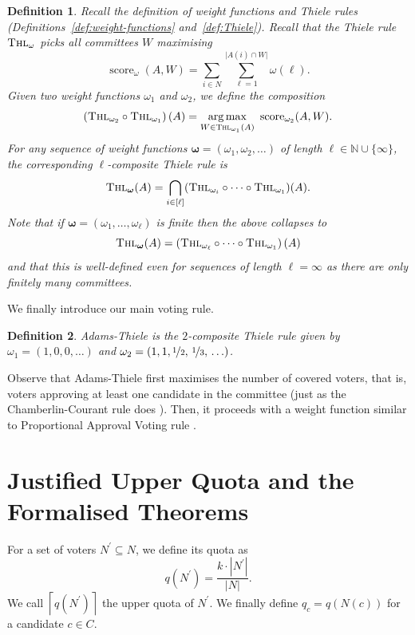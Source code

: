 \documentclass[11pt,a4paper]{article}
\newcommand{\voters}{N}
\newcommand{\candidates}{C}
\newcommand{\approfile}{A}
\newcommand{\app}[1]{A(#1)}
\newcommand{\committee}{W}
\newcommand{\weight}{\omega}
\newcommand{\num}{\ell}
\newcommand{\nats}{\mathbb N}
\newcommand{\Thiele}{\textnormal{\textsc{Thl}}}
\newcommand{\score}{\operatorname{score}}
\newcommand{\quota}{q}
\newcommand{\Adams}{\textnormal{Adams-Thiele}}
\newcommand{\vect}[1]{\left(#1\right)}
\newcommand{\ceil}[1]{\left\lceil#1\right\rceil}
\DeclareMathOperator*{\argmax}{arg\,max}
\newtheorem{definition}{Definition}
\begin{document}
\begin{definition}
  Recall the definition of weight functions
  and Thiele rules (Definitions~\ref{def:weight-functions} and~\ref{def:Thiele}).
  Recall that the Thiele rule $\Thiele_\weight$ picks
  all committees $\committee$ maximising
  \[
\score_{\weight}(\approfile,
    \committee)=
    \sum_{i\in\voters}\sum_{\num=1}^{\lvert\app{i}\cap
    \committee\rvert}\weight(\num).
  \]
  Given two weight functions $\weight_1$ and $\weight_2$, we define the composition
  \[
    \left(\Thiele_{\weight_2}\circ \Thiele_{\weight_1}\right)(\approfile) = \argmax_{\committee\in
    \Thiele_{\weight_1}\vect{\approfile}}\ \score_{\weight_2}\mathclose{\vect{\approfile, \committee}}.
  \]
  For any sequence of weight functions $\boldsymbol{\weight}=\vect{\weight_1,\weight_2,\ldots}$
  of length $\num\in\nats\cup\{\infty\}$,
  the
  corresponding \emph{$\num$-composite Thiele rule} is
  \[
    \Thiele_{\boldsymbol{\weight}}(\approfile) = \bigcap_{i\in[\num]}
    (\Thiele_{\weight_i}\circ \cdots \circ \Thiele_{\weight_1})(\approfile).
  \]
  Note that if $\boldsymbol{\weight}=\vect{\weight_1,\ldots,
  \weight_\num}$ is finite then the
  above collapses to
  \[
    \Thiele_{\boldsymbol{\weight}}(\approfile) =
    \left(\Thiele_{\weight_\num}\circ \cdots \circ \Thiele_{\weight_1}\right)(\approfile)
  \]
  and that this is well-defined even for sequences of length $\num = \infty$ as there are
  only finitely many committees.
\end{definition}

We finally introduce our main voting rule.

\begin{definition}\label{def:adams-thiele}
	\emph{\Adams} is the $2$-composite Thiele rule given by
  $\weight_1=\vect{1,0,0,\ldots}$ and
  $\weight_2=\vect{1,1,\nicefrac{1}{2},\,\nicefrac{1}{3},
  \,\ldots}$.
\end{definition}
Observe that \Adams{} first maximises the number of covered voters, that is,
voters approving at least one candidate in the committee (just as the Chamberlin-Courant rule does \cite{abcbook}).
Then, it proceeds with a weight function similar to Proportional Approval Voting rule \cite{abcbook}.

\section{Justified Upper Quota and the Formalised Theorems}
For a set of voters $\voters^\prime\subseteq\voters$, we define its quota as
\[
  \quota(\voters^\prime)
  =\frac{k\cdot|\voters^\prime|}{|\voters|}.
\]
We call $\ceil{\quota(\voters^\prime)}$ the upper quota of
$\voters^\prime$. We finally define $\quota_c=\quota(\voters(c))$ for a
candidate $c\in\candidates$.
\end{document}
